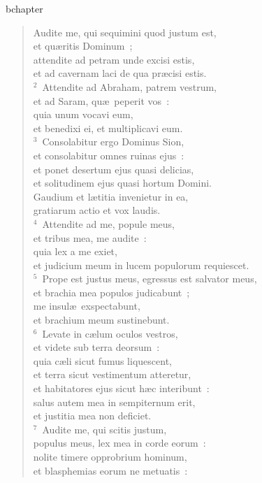 bchapter\begin{verse}\vspace{-19pt}Audite me, qui sequimini quod justum est,\\ et qu\ae ritis Dominum~;\\ attendite ad petram unde excisi estis,\\ et ad cavernam laci de qua pr\ae cisi estis.\\
${}^{2}$~Attendite ad Abraham, patrem vestrum,\\ et ad Saram, qu\ae\ peperit vos~:\\ quia unum vocavi eum,\\ et benedixi ei, et multiplicavi eum.\\
${}^{3}$~Consolabitur ergo Dominus Sion,\\ et consolabitur omnes ruinas ejus~:\\ et ponet desertum ejus quasi delicias,\\ et solitudinem ejus quasi hortum Domini.\\ Gaudium et l\ae titia invenietur in ea,\\ gratiarum actio et vox laudis.\\
${}^{4}$~Attendite ad me, popule meus,\\ et tribus mea, me audite~:\\ quia lex a me exiet,\\ et judicium meum in lucem populorum requiescet.\\
${}^{5}$~Prope est justus meus, egressus est salvator meus,\\ et brachia mea populos judicabunt~;\\ me insul\ae\ exspectabunt,\\ et brachium meum sustinebunt.\\
${}^{6}$~Levate in c\ae lum oculos vestros,\\ et videte sub terra deorsum~:\\ quia c\ae li sicut fumus liquescent,\\ et terra sicut vestimentum atteretur,\\ et habitatores ejus sicut h\ae c interibunt~:\\ salus autem mea in sempiternum erit,\\ et justitia mea non deficiet.\\
${}^{7}$~Audite me, qui scitis justum,\\ populus meus, lex mea in corde eorum~:\\ nolite timere opprobrium hominum,\\ et blasphemias eorum ne metuatis~:\\

\end{verse}
